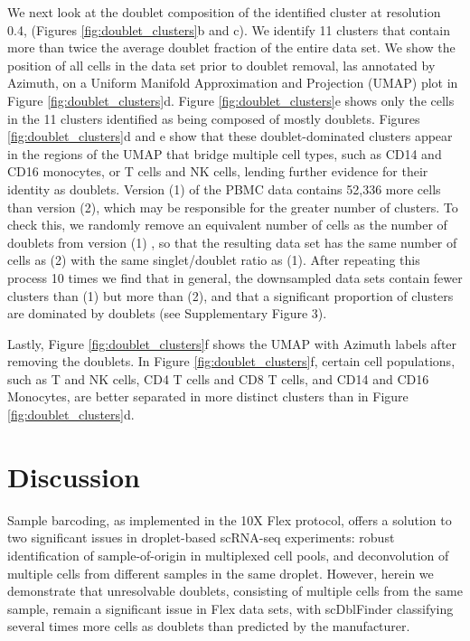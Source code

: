 \documentclass[unnumsec,webpdf,modern,large]{oup-authoring-template}
\begin{document}
	We next look at the doublet composition of the identified cluster at resolution 0.4, (Figures \ref{fig:doublet_clusters}b and c). 
	We identify 11 clusters that contain more than twice the average doublet fraction of the entire data set. 
	 We show the position of all cells in the data set prior to doublet removal, las annotated by Azimuth, on a Uniform Manifold Approximation and Projection (UMAP) plot in Figure \ref{fig:doublet_clusters}d. 
	 Figure \ref{fig:doublet_clusters}e shows only the cells in the 11 clusters identified as being composed of mostly doublets.
	 Figures \ref{fig:doublet_clusters}d and e show that these doublet-dominated clusters appear in the regions of the UMAP that bridge multiple cell types, such as CD14 and CD16 monocytes, or T cells and NK cells, lending further evidence for their identity as doublets. 
	 Version (1) of the PBMC data  contains 52,336 more cells than version (2), which may be responsible for the greater number of clusters. 
	 To check this, we randomly remove an equivalent number of cells as the number of doublets from version (1) , so that the resulting data set has the same number of cells as (2) with the same singlet/doublet ratio as (1). 
	 After repeating this process 10 times we find that in general, the downsampled data sets contain fewer clusters than (1) but more than (2), and that a significant proportion of clusters are dominated by doublets (see Supplementary Figure 3).	 
	 
	 Lastly, Figure  \ref{fig:doublet_clusters}f shows the UMAP with Azimuth labels after removing the doublets. 
	 In Figure  \ref{fig:doublet_clusters}f, certain cell populations, such as T and NK cells, CD4 T cells and CD8 T cells, and CD14 and CD16 Monocytes, are better separated in more distinct clusters than in Figure  \ref{fig:doublet_clusters}d.
	
	\section{Discussion}
	\label{sec:discussion}
	
	Sample barcoding, as implemented in the 10X Flex protocol, offers a solution to two significant issues in droplet-based scRNA-seq experiments: robust identification of sample-of-origin in multiplexed cell pools, and deconvolution of multiple cells from different samples in the same droplet. 
	However, herein we demonstrate that unresolvable doublets, consisting of multiple cells from the same sample, remain a significant issue in Flex data sets, with scDblFinder classifying several times more cells as doublets than predicted by the manufacturer. 
	
\end{document}

